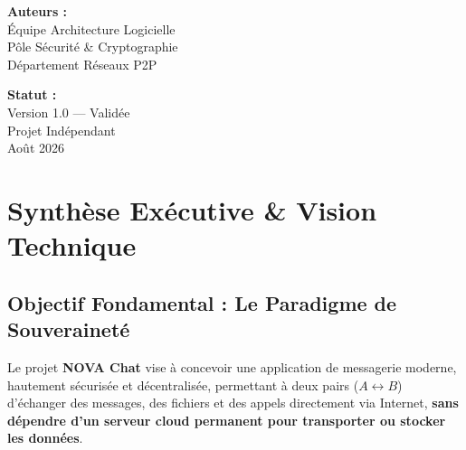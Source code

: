 \documentclass[11pt,a4paper]{article}
\begin{document}
\begin{titlepage}
\begin{center}
        \begin{minipage}{0.45\textwidth}
            \begin{flushleft} \large
                \textbf{\textcolor{novapurple}{Auteurs :}} \\
                Équipe Architecture Logicielle \\
                Pôle Sécurité \& Cryptographie \\
                Département Réseaux P2P
            \end{flushleft}
        \end{minipage}
        \begin{minipage}{0.45\textwidth}
            \begin{flushright} \large
                \textbf{\textcolor{novapurple}{Statut :}} \\
                Version 1.0 — Validée \\
                Projet Indépendant \\
                Août 2026
            \end{flushright}
        \end{minipage}
        
        \vspace{1.0cm}
    \end{center}
\end{titlepage}

\nopagecolor
\color{black}

\tableofcontents
\newpage

\section{Synthèse Exécutive \& Vision Technique}

\subsection{Objectif Fondamental : Le Paradigme de Souveraineté}
Le projet \textbf{NOVA Chat} vise à concevoir une application de messagerie moderne, hautement sécurisée et décentralisée, permettant à deux pairs ($A \leftrightarrow B$) d'échanger des messages, des fichiers et des appels directement via Internet, \textbf{sans dépendre d'un serveur cloud permanent pour transporter ou stocker les données}.
\end{document}
